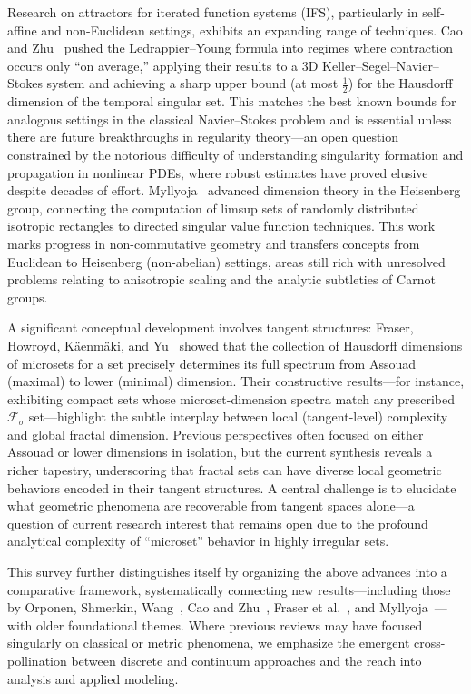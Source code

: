 \documentclass[sigconf]{acmart}
\begin{document}
Research on attractors for iterated function systems (IFS), particularly in self-affine and non-Euclidean settings, exhibits an expanding range of techniques. Cao and Zhu~\cite{ref70} pushed the Ledrappier–Young formula into regimes where contraction occurs only “on average,” applying their results to a 3D Keller–Segel–Navier–Stokes system and achieving a sharp upper bound (at most $\frac{1}{2}$) for the Hausdorff dimension of the temporal singular set. This matches the best known bounds for analogous settings in the classical Navier–Stokes problem and is essential unless there are future breakthroughs in regularity theory—an open question constrained by the notorious difficulty of understanding singularity formation and propagation in nonlinear PDEs, where robust estimates have proved elusive despite decades of effort. Myllyoja~\cite{ref73} advanced dimension theory in the Heisenberg group, connecting the computation of limsup sets of randomly distributed isotropic rectangles to directed singular value function techniques. This work marks progress in non-commutative geometry and transfers concepts from Euclidean to Heisenberg (non-abelian) settings, areas still rich with unresolved problems relating to anisotropic scaling and the analytic subtleties of Carnot groups.

A significant conceptual development involves tangent structures: Fraser, Howroyd, Käenmäki, and Yu~\cite{ref72} showed that the collection of Hausdorff dimensions of microsets for a set precisely determines its full spectrum from Assouad (maximal) to lower (minimal) dimension. Their constructive results—for instance, exhibiting compact sets whose microset-dimension spectra match any prescribed $\mathcal{F}_\sigma$ set—highlight the subtle interplay between local (tangent-level) complexity and global fractal dimension. Previous perspectives often focused on either Assouad or lower dimensions in isolation, but the current synthesis reveals a richer tapestry, underscoring that fractal sets can have diverse local geometric behaviors encoded in their tangent structures. A central challenge is to elucidate what geometric phenomena are recoverable from tangent spaces alone—a question of current research interest that remains open due to the profound analytical complexity of “microset” behavior in highly irregular sets.

This survey further distinguishes itself by organizing the above advances into a comparative framework, systematically connecting new results—including those by Orponen, Shmerkin, Wang~\cite{ref68,ref92}, Cao and Zhu~\cite{ref70}, Fraser et al.~\cite{ref72}, and Myllyoja~\cite{ref73}—with older foundational themes. Where previous reviews may have focused singularly on classical or metric phenomena, we emphasize the emergent cross-pollination between discrete and continuum approaches and the reach into analysis and applied modeling.
\end{document}
